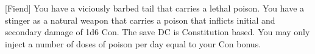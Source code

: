  {[Fiend]}
\shortfeat
{You have a viciously barbed tail that carries a lethal poison.}
{You have a stinger as a natural weapon that carries a poison that inflicts initial and secondary damage of 1d6 Con. The save DC is Constitution based. You may only inject a number of doses of poison per day equal to your Con bonus.}
